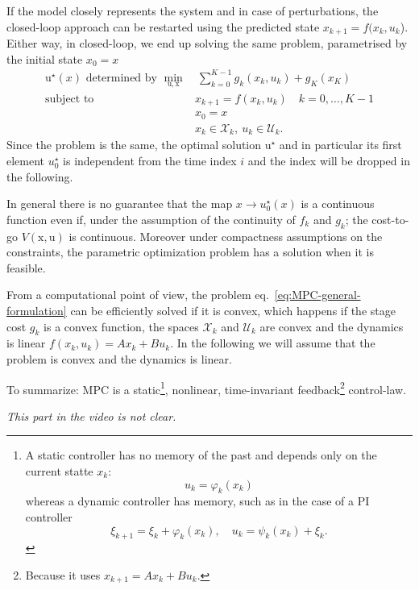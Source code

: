 \documentclass[11pt]{report}
\newcommand{\bs}[1]{\boldsymbol{#1}}
\newcommand{\bsu}{\bs{\mathrm{u}}}
\newcommand{\bsx}{\bs{\mathrm{x}}}
\begin{document}
If the model closely represents the system and in case of perturbations, the closed-loop approach can be restarted using the predicted state $x_{k+1} = f(x_k,u_k$). Either way, in closed-loop, we end up solving the same problem, parametrised by the initial state $x_0=x$
\begin{align*}
  \bsu^\star(x) \text{ determined by } \min_{\bsu, \bsx} &\ \sum_{k=0}^{K-1}g_k(x_k, u_k) + g_K(x_K)\\
  \text{subject to } & x_{k+1} = f(x_k,u_k)\quad k=0,\ldots,K-1 \\
                                                         & x_0 = x \\
                                                         & x_k \in \mathcal{X}_k,\ u_k \in \mathcal{U}_k.
\end{align*}
Since the problem is the same, the optimal solution $\bsu^\star$ and in particular its first element $u_0^\star$ is independent from the time index $i$ and the index will be dropped in the following.

In general there is no guarantee that the map $x \rightarrow u_0^\star(x)$ is a continuous function even if, under the assumption of the continuity of $f_k$ and $g_k$; the cost-to-go $V(\bsx,\bsu)$ is continuous. Moreover under compactness assumptions on the constraints, the parametric optimization problem has a solution when it is feasible.

From a computational point of view, the problem eq.~\eqref{eq:MPC-general-formulation} can be efficiently solved if it is convex, which happens if the stage cost $g_k$ is a convex function, the spaces $\mathcal{X}_k$ and $\mathcal{U}_k$ are convex and the dynamics is linear $f(x_k,u_k)=Ax_k+Bu_k$. In the following we will assume that the problem is convex and the dynamics is linear.

To summarize: MPC is a static\footnote{A static controller has no   memory of the past and depends only on the current statte $x_k$:
  \begin{equation*}
    u_k = \varphi_k(x_k)
  \end{equation*}
  whereas a dynamic controller has memory, such as in the case of a
  PI controller
  \begin{equation*}
    \xi_{k+1} = \xi_k + \varphi_k(x_k),\quad u_k = \psi_k(x_k) + \xi_k.
  \end{equation*}}, nonlinear, time-invariant feedback\footnote{Because it uses $x_{k+1}=Ax_k+Bu_k$.} control-law.


\emph{This part in the video is not clear.}
\end{document}
